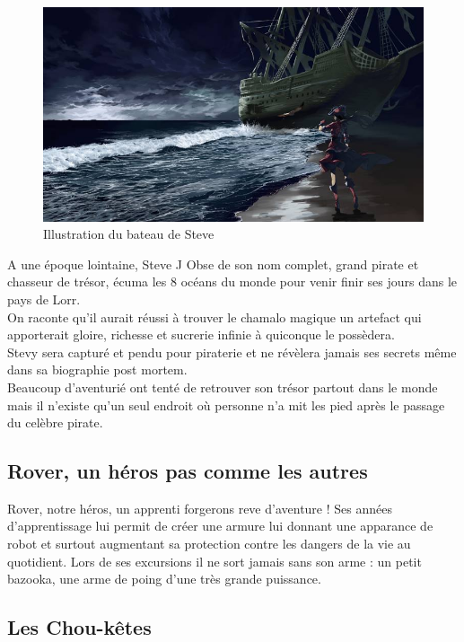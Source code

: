 \documentclass[a4paper 12pts]{article}
\begin{document}
\begin{figure}[h]
  	\includegraphics[width=350pt]{Illustration/Steve.jpg}
	\caption{Illustration du bateau de Steve}
\end{figure}

\vspace{1cm}

A une époque lointaine, Steve J Obse de son nom complet, grand pirate et chasseur de trésor, écuma les 8 océans du monde pour venir finir ses jours dans le pays de Lorr.\\
On raconte qu'il aurait réussi à trouver le chamalo magique un artefact qui apporterait gloire, richesse et sucrerie infinie à quiconque le possèdera.\\
Stevy sera capturé et pendu pour piraterie et ne révèlera jamais ses secrets même dans sa biographie post mortem.\\
Beaucoup d'aventurié ont tenté de retrouver son trésor partout dans le monde mais il n'existe qu'un seul endroit où personne n'a mit les pied après le passage du celèbre pirate.



\subsection{Rover, un héros pas comme les autres}


Rover, notre héros, un apprenti forgerons reve d'aventure ! Ses années d'apprentissage lui permit de créer une armure lui donnant une apparance de robot et surtout augmentant sa protection contre les dangers de la vie au quotidient.
Lors de ses excursions il ne sort jamais sans son arme :  un petit bazooka, une arme de poing d'une très grande puissance.


\subsection{Les Chou-kêtes}
\end{document}
